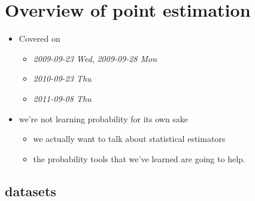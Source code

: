 
\chapter{Overview of point estimation}

\begin{itemize}
\item Covered on
\begin{itemize}
\item \textit{2009-09-23 Wed}, \textit{2009-09-28 Mon}
\item \textit{2010-09-23 Thu}
\item \textit{2011-09-08 Thu}
\end{itemize}
\item we're not learning probability for its own sake
\begin{itemize}
\item we actually want to talk about statistical estimators
\item the probability tools that we've learned are going to help.
\end{itemize}
\end{itemize}
\section{datasets}
\label{sec-1}

